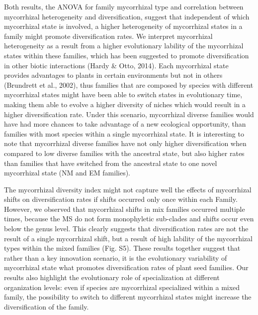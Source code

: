 \documentclass[12pt,]{article}
\begin{document}
Both results, the ANOVA for family mycorrhizal type and correlation
between mycorrhizal heterogeneity and diversification, suggest that
independent of which mycorrhizal state is involved, a higher
heterogeneity of mycorrhizal states in a family might promote
diversification rates. We interpret mycorrhizal heterogeneity as a
result from a higher evolutionary lability of the mycorrhizal states
within these families, which has been suggested to promote
diversification in other biotic interactions (Hardy \& Otto, 2014). Each
mycorrhizal state provides advantages to plants in certain environments
but not in others (Brundrett et al., 2002), thus families that are
composed by species with different mycorrhizal states might have been
able to switch states in evolutionary time, making them able to evolve a
higher diversity of niches which would result in a higher
diversification rate. Under this scenario, mycorrhizal diverse families
would have had more chances to take advantage of a new ecological
opportunity, than families with most species within a single mycorrhizal
state. It is interesting to note that mycorrhizal diverse families have
not only higher diversification when compared to low diverse families
with the ancestral state, but also higher rates than families that have
switched from the ancestral state to one novel mycorrhizal state (NM and
EM families).

The mycorrhizal diversity index might not capture well the effects of
mycorrhizal shifts on diversification rates if shifts occurred only once
within each Family. However, we observed that mycorrhizal shifts in mix
families occurred multiple times, because the MS do not form
monophyletic sub-clades and shifts occur even below the genus level.
This clearly suggests that diversification rates are not the result of a
single mycorrhizal shift, but a result of high lability of the
mycorrhizal types within the mixed families (Fig. S5). These results
together suggest that rather than a key innovation scenario, it is the
evolutionary variability of mycorrhizal state what promotes
diversification rates of plant seed families. Our results also highlight
the evolutionary role of specialization at different organization
levels: even if species are mycorrhizal specialized within a mixed
family, the possibility to switch to different mycorrhizal states might
increase the diversification of the family.
\end{document}
